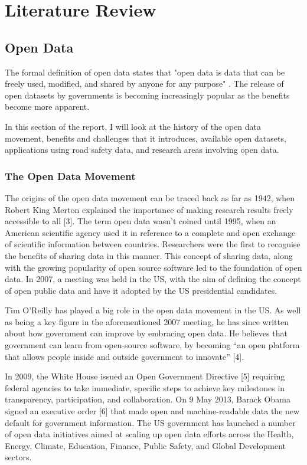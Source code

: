 \documentclass[authoryearcitations]{UoYCSproject}
\begin{document}
\chapter{Literature Review}

\section{Open Data}

The formal definition of open data states that "open data is data that can be freely used, modified, and shared by anyone for any purpose" \citep{OpenKnowledge}. The release of open datasets by governments is becoming increasingly popular as the benefits become more apparent.

In this section of the report, I will look at the history of the open data movement, benefits and challenges that it introduces, available open datasets, applications using road safety data, and research areas involving open data.

\subsection{The Open Data Movement}

The origins of the open data movement can be traced back as far as 1942, when Robert King Merton explained the importance of making research results freely accessible to all [3]. The term open data wasn’t coined until 1995, when an American scientific agency used it in reference to a complete and open exchange of scientific information between countries. Researchers were the first to recognise the benefits of sharing data in this manner. This concept of sharing data, along with the growing popularity of open source software led to the foundation of open data. In 2007, a meeting was held in the US, with the aim of defining the concept of open public data and have it adopted by the US presidential candidates. 

Tim O’Reilly has played a big role in the open data movement in the US. As well as being a key figure in the aforementioned 2007 meeting, he has since written about how government can improve by embracing open data.  He believes that government can learn from open-source software, by becoming “an open platform that allows people inside and outside government to innovate” [4]. 

In 2009,  the White House issued an Open Government Directive [5] requiring federal agencies to take immediate, specific steps to achieve key milestones in transparency, participation, and collaboration. On 9 May 2013, Barack Obama signed an executive order [6] that made open and machine-readable data the new default for government information. The US government has launched a number of open data initiatives aimed at scaling up open data efforts across the Health, Energy, Climate, Education, Finance, Public Safety, and Global Development sectors.
\end{document}
